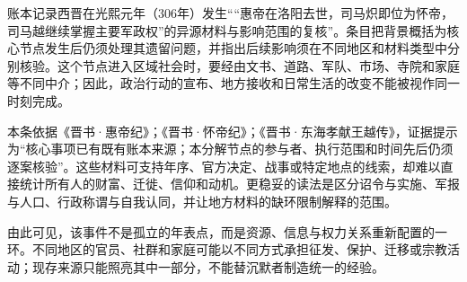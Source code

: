 账本记录西晋在光熙元年（306年）发生““惠帝在洛阳去世，司马炽即位为怀帝，司马越继续掌握主要军政权”的异源材料与影响范围的复核”。条目把背景概括为核心节点发生后仍须处理其遗留问题，并指出后续影响须在不同地区和材料类型中分别核验。这个节点进入区域社会时，要经由文书、道路、军队、市场、寺院和家庭等不同中介；因此，政治行动的宣布、地方接收和日常生活的改变不能被视作同一时刻完成。

本条依据《晋书·惠帝纪》；《晋书·怀帝纪》；《晋书·东海孝献王越传》，证据提示为“核心事项已有既有账本来源；本分解节点的参与者、执行范围和时间先后仍须逐案核验”。这些材料可支持年序、官方决定、战事或特定地点的线索，却难以直接统计所有人的财富、迁徙、信仰和动机。更稳妥的读法是区分诏令与实施、军报与人口、行政称谓与自我认同，并让地方材料的缺环限制解释的范围。

由此可见，该事件不是孤立的年表点，而是资源、信息与权力关系重新配置的一环。不同地区的官员、社群和家庭可能以不同方式承担征发、保护、迁移或宗教活动；现存来源只能照亮其中一部分，不能替沉默者制造统一的经验。
